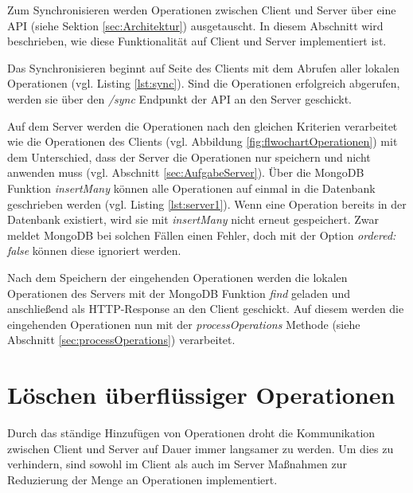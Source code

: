 \documentclass[a4paper, 12pt]{scrreprt}
\begin{document}
Zum Synchronisieren werden Operationen zwischen Client und Server über eine API (siehe Sektion \ref{sec:Architektur}) ausgetauscht. In diesem Abschnitt wird beschrieben, wie diese Funktionalität auf Client und Server implementiert ist.

Das Synchronisieren beginnt auf Seite des Clients mit dem Abrufen aller lokalen Operationen (vgl. Listing \ref{lst:sync}). Sind die Operationen erfolgreich abgerufen, werden sie über den \textit{/sync} Endpunkt der API an den Server geschickt. 

\begin{minipage}{\linewidth}
	
\end{minipage}

Auf dem Server werden die Operationen nach den gleichen Kriterien verarbeitet wie die Operationen des Clients (vgl. Abbildung \ref{fig:flwochartOperationen}) mit dem Unterschied, dass der Server die Operationen nur speichern und nicht anwenden muss (vgl. Abschnitt \ref{sec:AufgabeServer}). Über die MongoDB Funktion \textit{insertMany} können alle Operationen auf einmal in die Datenbank geschrieben werden (vgl. Listing  \ref{lst:server1}). Wenn eine Operation bereits in der Datenbank existiert, wird sie mit \textit{insertMany} nicht erneut gespeichert. Zwar meldet MongoDB bei solchen Fällen einen Fehler, doch mit der Option \textit{ordered: false} können diese ignoriert werden.

Nach dem Speichern der eingehenden Operationen werden die lokalen Operationen des Servers mit der MongoDB Funktion \textit{find} geladen und anschließend als HTTP-Response an den Client geschickt. Auf diesem werden die eingehenden Operationen nun mit der \textit{processOperations} Methode (siehe Abschnitt \ref{sec:processOperations}) verarbeitet.

\begin{minipage}{\linewidth}
	
\end{minipage}

\section{Löschen überflüssiger Operationen}

Durch das ständige Hinzufügen von Operationen droht die Kommunikation zwischen Client und Server auf Dauer immer langsamer zu werden. Um dies zu verhindern, sind sowohl im Client als auch im Server Maßnahmen zur Reduzierung der Menge an Operationen implementiert.
\end{document}
